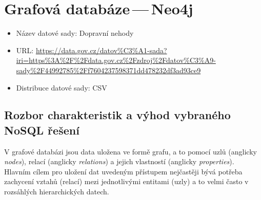 \documentclass[a4paper, 11pt]{article}
\begin{document}
    \section{Grafová databáze\,---\,Neo4j}

    \begin{itemize}
        \item Název datové sady: Dopravní nehody
        \item URL: \url{https://data.gov.cz/datov%C3%A1-sada?iri=https%3A%2F%2Fdata.gov.cz%2Fzdroj%2Fdatov%C3%A9-sady%2F44992785%2Ff7604237598371dd478232df3ad93ce9}
        \item Distribuce datové sady: CSV
    \end{itemize}

    \subsection{Rozbor charakteristik a výhod vybraného NoSQL řešení}
    V grafové databázi jsou data uložena ve formě grafu, a to pomocí uzlů (anglicky \textit{nodes}), relací (anglicky \textit{relations}) a jejich vlastností (anglicky \textit{properties}). Hlavním cílem pro uložení dat uvedeným přístupem nejčastěji bývá potřeba zachycení vztahů (relací) mezi jednotlivými entitami (uzly) a to velmi často v rozsáhlých hierarchických datech.
\end{document}
